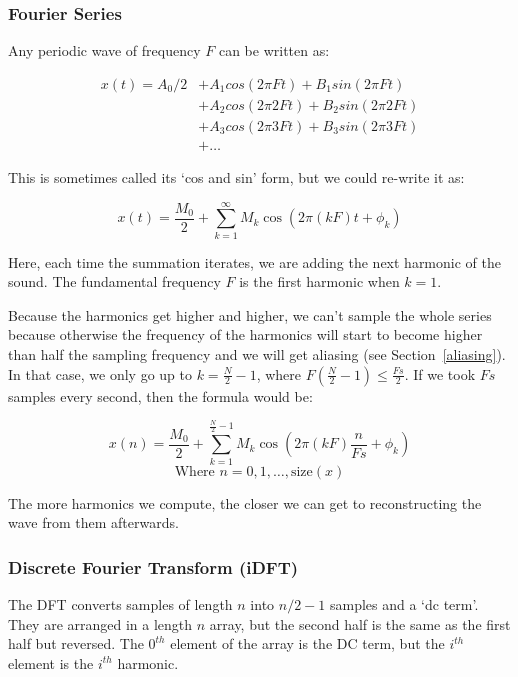 \subsubsection{Fourier Series}

Any periodic wave of frequency $F$ can be written as:

\begin{align*}
  x(t) = A_0 / 2 &+ A_1 cos(2 \pi Ft) + B_1 sin(2\pi Ft)\\
                 &+ A_2 cos(2 \pi 2Ft) + B_2 sin(2\pi 2Ft)\\
                 &+ A_3 cos(2 \pi 3Ft) + B_3 sin(2\pi 3Ft)\\
                 &+ \dots
\end{align*}

This is sometimes called its `cos and sin' form, but we could re-write it as:

\[
  x(t) = \frac{M_0}{2} + \sum\limits^\infty_{k=1}M_k\cos(2\pi (kF)t + \phi_k)
\]

Here, each time the summation iterates, we are adding the next harmonic of the
sound. The fundamental frequency $F$ is the first harmonic when $k=1$.

Because the harmonics get higher and higher, we can't sample the whole series
because otherwise the frequency of the harmonics will start to become higher
than half the sampling frequency and we will get aliasing (see
Section~\ref{aliasing}). In that case, we only go up to $k=\frac{N}{2} - 1$,
where $F(\frac{N}{2} - 1) \le \frac{Fs}{2}$. If we took $Fs$ samples every
second, then the formula would be:

\[
  x(n) = \frac{M_0}{2} + \sum\limits^{\frac{N}{2}-1}_{k=1}M_k\cos\left(2\pi (kF)\frac{n}{Fs} + \phi_k\right)
\]
\[
  \text{Where } n = 0,1,\dots,\text{size}(x)
\]

The more harmonics we compute, the closer we can get to reconstructing the wave
from them afterwards.

\subsubsection{Discrete Fourier Transform (iDFT)}

The DFT converts samples of length $n$ into $n/2 - 1$ samples and a `dc term'.
They are arranged in a length $n$ array, but the second half is the same as the
first half but reversed. The $0^{th}$ element of the array is the DC term, but
the $i^{th}$ element is the $i^{th}$ harmonic. 

